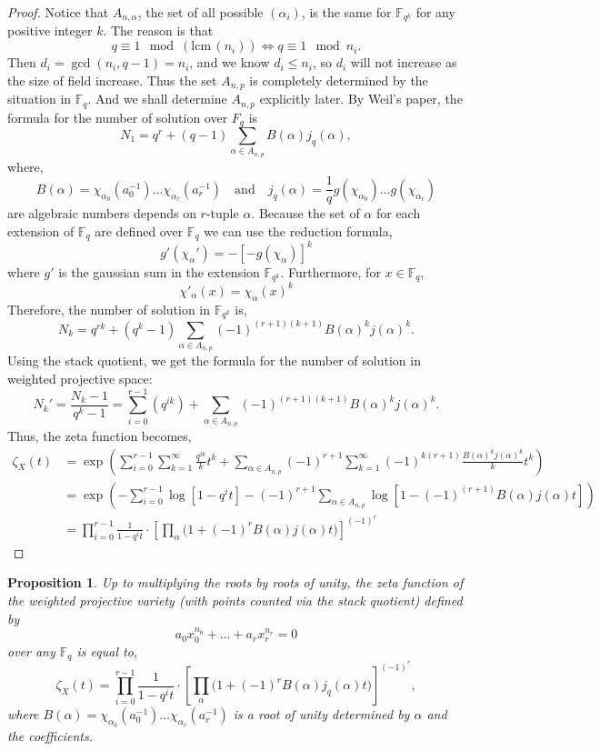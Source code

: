 \documentclass{article}
\newcommand{\F}{\mathbb{F}}
\newcommand{\lcm}[0]{\mathrm{lcm} \,}
\newtheorem{proposition}[theorem]{Proposition}
\theoremstyle{definition}
\theoremstyle{definition}
\theoremstyle{remark}
\begin{document}
\begin{proof}
Notice that $A_{n,\alpha}$, the set of all possible $(\alpha_i)$, is the same for $\F_{q^k}$ for any positive integer $k$. The reason is that \[q \equiv 1 \mod (\lcm(n_i)) \iff q \equiv 1 \mod n_i.\] Then $d_i = \gcd(n_i, q-1) = n_i$, and we know $d_i \leq n_i$, so $d_i$ will not increase as the size of field increase. Thus the set $A_{n,p}$ is completely determined by the situation in $\F_q$. And we shall determine $A_{n,p}$ explicitly later.
By Weil's paper, the formula for the number of solution over $F_{q}$ is 
\[N_1 = q^{r} + (q - 1) \sum_{\alpha \in A_{n,p}} B(\alpha) j_q(\alpha),\]
where, 
\[B(\alpha) = \chi_{\alpha_0}(a_0^{-1}) \dots \chi_{\alpha_r}(a_r^{-1}) \quad \text{and} \quad j_q(\alpha) = \frac{1}{q} g(\chi_{\alpha_0}) \dots g(\chi_{\alpha_r})\] 
are algebraic numbers depends on $r$-tuple $\alpha$.
Because the set of $\alpha$ for each extension of $\F_{q}$ are defined over $\F_{q}$ we can use the reduction formula,
\[g'(\chi_\alpha') = -[-g(\chi_\alpha)]^k\] where $g'$ is the gaussian sum in the extension $\F_{q^k}$. 
Furthermore, for $x \in \F_q$,
\[ \chi'_{\alpha}(x) = \chi_{\alpha}(x)^k\] Therefore, the number of solution in $\F_{q^k}$ is,
\[N_k = q^{rk} + (q^k - 1) \sum_{\alpha \in A_{n,p}} (-1)^{(r+1)(k+1)}B(\alpha)^k j(\alpha)^k.\]
Using the stack quotient, we get the formula for the number of solution in weighted projective space: 
\[ N_k' = \frac{N_k - 1}{q^k - 1} = \sum_{i = 0}^{r-1}(q^{ik}) + \sum_{\alpha \in A_{n,p}} (-1)^{(r+1)(k+1)}B(\alpha)^k j(\alpha)^k.\]
Thus, the zeta function becomes,
\begin{align*}
\zeta_X(t) &= \exp \left( \sum_{i = 0}^{r-1} \sum_{k = 1}^{\infty} \frac{q^{ik}}{k}t^k + \sum_{\alpha \in A_{n,p}} (-1)^{r+1} \sum_{k = 1}^{\infty} (-1)^{k(r + 1)} \frac{B(\alpha)^k j(\alpha)^k}{k} t^k \right)
\\
&= \exp \left( - \sum_{i = 0}^{r-1} \log\left[ 1 - q^i t \right] - (-1)^{r+1} \sum_{\alpha \in A_{n,p}} \log \left[ 1 - (-1)^{(r + 1)} B(\alpha) j(\alpha) t \right] \right)
\\
&= \prod_{i = 0}^{r-1} \frac{1}{1 - q^i t}\cdot \left[ \prod_{\alpha} \bigg(1 + (-1)^r B(\alpha)j(\alpha)t \bigg) \right]^{(-1)^{r}}
\end{align*}
\end{proof}

\begin{proposition}
Up to multiplying the roots by roots of unity, the zeta function of the weighted projective variety (with points counted via the stack quotient) defined by 
\[ a_0 x_0^{n_0} + \dots + a_r x_r^{n_r} = 0 \] 
over any $\F_q$ is equal to,
\[
\zeta_X(t) = \prod_{i = 0}^{r-1} \frac{1}{1 - q^i t} \cdot 
\left[ \prod_{\alpha}  \bigg( 1 + (-1)^r B(\alpha)j_q(\alpha)t \bigg) \right]^{(-1)^{r}},
\] 
where $B(\alpha) = \chi_{\alpha_0}(a_0^{-1}) \dots \chi_{\alpha_r}(a_r^{-1})$ is a root of unity determined by $\alpha$ and the coefficients.
\end{proposition}
\end{document}
